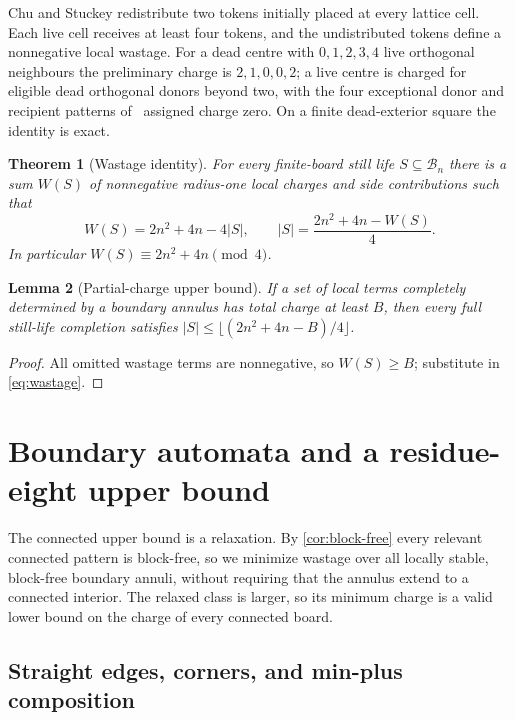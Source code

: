 \documentclass[10pt]{article}
\newtheorem{theorem}{Theorem}[section]
\newtheorem{lemma}[theorem]{Lemma}
\theoremstyle{remark}
\newcommand{\B}{\mathcal B}
\begin{document}
Chu and Stuckey redistribute two tokens initially placed at every lattice
cell.  Each live cell receives at least four tokens, and the undistributed
tokens define a nonnegative local wastage.  For a dead centre with
$0,1,2,3,4$ live orthogonal neighbours the preliminary charge is $2,1,0,0,2$; a
live centre is charged for eligible dead orthogonal donors beyond two, with the
four exceptional donor and recipient patterns of~\cite{chu-stuckey-2012}
assigned charge zero.  On a finite dead-exterior square the identity is exact.

\begin{theorem}[Wastage identity]\label{thm:wastage}
For every finite-board still life $S\subseteq\B_n$ there is a sum $W(S)$ of
nonnegative radius-one local charges and side contributions such that
\begin{equation}\label{eq:wastage}
 W(S)=2n^2+4n-4|S|,
 \qquad
 |S|=\frac{2n^2+4n-W(S)}4.
\end{equation}
In particular $W(S)\equiv2n^2+4n\pmod4$.
\end{theorem}

\begin{lemma}[Partial-charge upper bound]\label{lem:partial-charge}
If a set of local terms completely determined by a boundary annulus has total
charge at least $B$, then every full still-life completion satisfies
$|S|\le\lfloor(2n^2+4n-B)/4\rfloor$.
\end{lemma}

\begin{proof}
All omitted wastage terms are nonnegative, so $W(S)\ge B$; substitute in
\eqref{eq:wastage}.
\end{proof}

\section{Boundary automata and a residue-eight upper bound}\label{sec:boundary}

The connected upper bound is a relaxation.  By \cref{cor:block-free} every
relevant connected pattern is block-free, so we minimize wastage over all
locally stable, block-free boundary annuli, without requiring that the annulus
extend to a connected interior.  The relaxed class is larger, so its minimum
charge is a valid lower bound on the charge of every connected board.

\subsection{Straight edges, corners, and min-plus composition}
\end{document}
